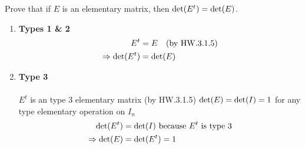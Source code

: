 Prove that if $E$ is an elementary matrix, then $\text{det}({E^t}) = \text{det}({E})$.
\begin{enumerate}
\item {\bf Types 1 \& 2}
\begin{align}
E^t &= E \quad \text{(by HW.3.1.5)}\\
\Rightarrow \text{det}({E^t}) &= \text{det}({E})
\end{align}
\item {\bf Type 3}
\paragraph{} $E^t$ is an type 3 elementary matrix (by HW.3.1.5)
$\text{det}({E}) = \text{det}({I}) = 1$ for any type elementary operation on $I_n$
\begin{align}
\text{det}({E^t}) &= \text{det}({I}) \text{ because } E^t \text{ is type 3}\\
\Rightarrow \text{det}({E}) &= \text{det}({E^t}) =1 
\end{align}
\end{enumerate}
